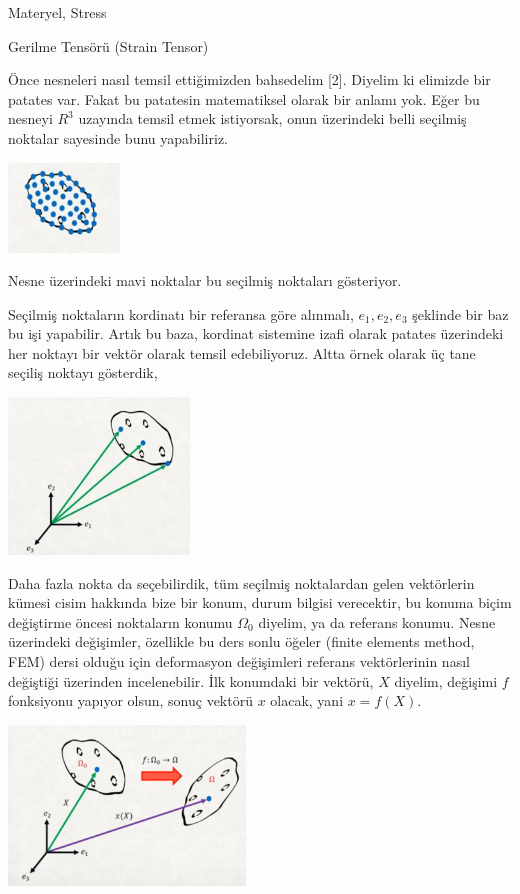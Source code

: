 \documentclass[12pt,fleqn]{article}\usepackage{../../common}
\begin{document}
Materyel, Stress

Gerilme Tensörü (Strain Tensor) 

Önce nesneleri nasıl temsil ettiğimizden bahsedelim [2]. Diyelim ki elimizde bir
patates var. Fakat bu patatesin matematiksel olarak bir anlamı yok. Eğer bu
nesneyi $R^3$ uzayında temsil etmek istiyorsak, onun üzerindeki belli seçilmiş
noktalar sayesinde bunu yapabiliriz.

\includegraphics[width=8em]{phy_020_strs_01_01.jpg}

Nesne üzerindeki mavi noktalar bu seçilmiş noktaları gösteriyor.

Seçilmiş noktaların kordinatı bir referansa göre alınmalı, $e_1,e_2,e_3$
şeklinde bir baz bu işi yapabilir. Artık bu baza, kordinat sistemine izafi
olarak patates üzerindeki her noktayı bir vektör olarak temsil edebiliyoruz.
Altta örnek olarak üç tane seçiliş noktayı gösterdik,

\includegraphics[width=13em]{phy_020_strs_01_02.jpg}

Daha fazla nokta da seçebilirdik, tüm seçilmiş noktalardan gelen vektörlerin
kümesi cisim hakkında bize bir konum, durum bilgisi verecektir, bu konuma biçim
değiştirme öncesi noktaların konumu $\Omega_0$ diyelim, ya da referans konumu.
Nesne üzerindeki değişimler, özellikle bu ders sonlu öğeler (finite elements
method, FEM) dersi olduğu için deformasyon değişimleri referans vektörlerinin
nasıl değiştiği üzerinden incelenebilir. İlk konumdaki bir vektörü, $X$ diyelim,
değişimi $f$ fonksiyonu yapıyor olsun, sonuç vektörü $x$ olacak, yani $x =
f(X)$.

\includegraphics[width=17em]{phy_020_strs_01_03.jpg}
\end{document}
